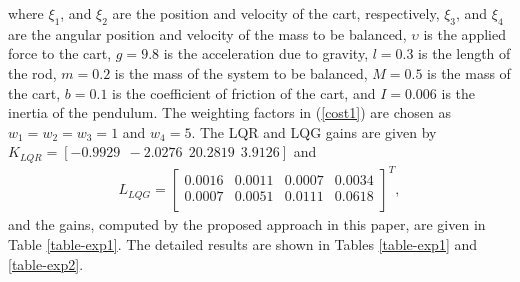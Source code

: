 \documentclass{amsart}
\numberwithin{equation}{section}
\begin{document}
where $\xi_1$, and $\xi_2$ are the position and velocity of the cart, respectively, $\xi_3$, and $\xi_4$ are the angular position and velocity of the mass to be balanced, $\upsilon$ is the applied force to the cart, $g=9.8$ is the acceleration due to gravity, $l=0.3$ is the length of the rod, $m=0.2$ is the mass of the system to be balanced, $M=0.5$ is the mass of the cart, $b=0.1$ is the coefficient of friction of the cart, and $I=0.006$ is the inertia of the pendulum. The weighting factors in (\ref{cost1}) are chosen as $w_1=w_2=w_3=1$ and $w_4=5$. The LQR and LQG gains are given by $K_{LQR}=[-0.9929~~-2.0276~~20.2819~~3.9126]$ and 
\begin{align}\nonumber
L_{LQG}=\left[{\begin{array}{cccc}
0.0016&0.0011&0.0007&0.0034\\
0.0007&0.0051&0.0111&0.0618\\
 \end{array}}\right]^T,
\end{align}
and the gains, computed by the proposed approach in this paper, are given in Table \ref{table-exp1}. The detailed results are shown in Tables \ref{table-exp1} and \ref{table-exp2}. 
\end{document}
